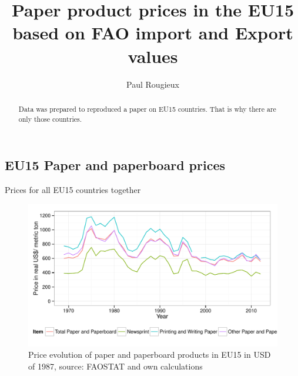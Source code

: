 \documentclass{scrartcl}\usepackage{graphicx, color}
\title{Paper product prices in the EU15 based on FAO import and Export values}
\author{Paul Rougieux}
\newenvironment{knitrout}{}{} %
\begin{document}
\maketitle

\begin{abstract}
Data was prepared to reproduced a paper on EU15 countries. That is why there are only those countries. 
\end{abstract}








\subsection{EU15 Paper and paperboard prices}
Prices for all EU15 countries together
\begin{knitrout}
\color{fgcolor}\begin{figure}[h]


{\centering \includegraphics[width=1\linewidth]{figure/PriceEU15Extended} 

}

\caption[Price evolution of paper and paperboard products in EU15 in USD of 1987, source]{Price evolution of paper and paperboard products in EU15 in USD of 1987, source: FAOSTAT and own calculations\label{fig:PriceEU15Extended}}
\end{figure}


\end{knitrout}
\end{document}
